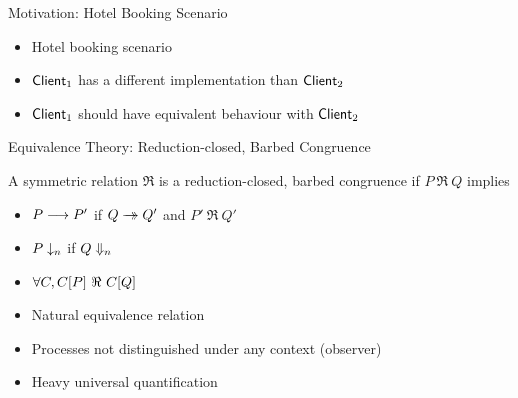 \documentclass{beamer}
\begin{document}
	\begin{frame}{Motivation: Hotel Booking Scenario}
		\begin{itemize}
			\item	Hotel booking scenario
				

			\item	$\mathsf{Client}_1$ has a different implementation than $\mathsf{Client}_2$
			\item	$\mathsf{Client}_1$ should have equivalent behaviour with $\mathsf{Client}_2$%
		\end{itemize}
	\end{frame}

	\begin{frame}{Equivalence Theory: Reduction-closed, Barbed Congruence}
				\begin{definition}
				A symmetric relation $\Re$ is  a reduction-closed, barbed congruence
				if $P\ \Re\ Q$ implies
				\begin{itemize}
					\item	$P \longrightarrow P'$ if $Q \rightarrow\!\!\!\!\!\rightarrow Q'$ and $P'\ \Re\ Q'$
					\item	$P \downarrow_{n}$ if $Q \Downarrow_{n}$
					\item	$\forall C, \context{C}{P}\ \Re\ \context{C}{Q}$
				\end{itemize}
				\end{definition}

		\begin{itemize}
			\item	Natural equivalence relation
			\item	Processes not distinguished under any context (observer)
			\item	Heavy universal quantification
		\end{itemize}
	\end{frame}
\end{document}
